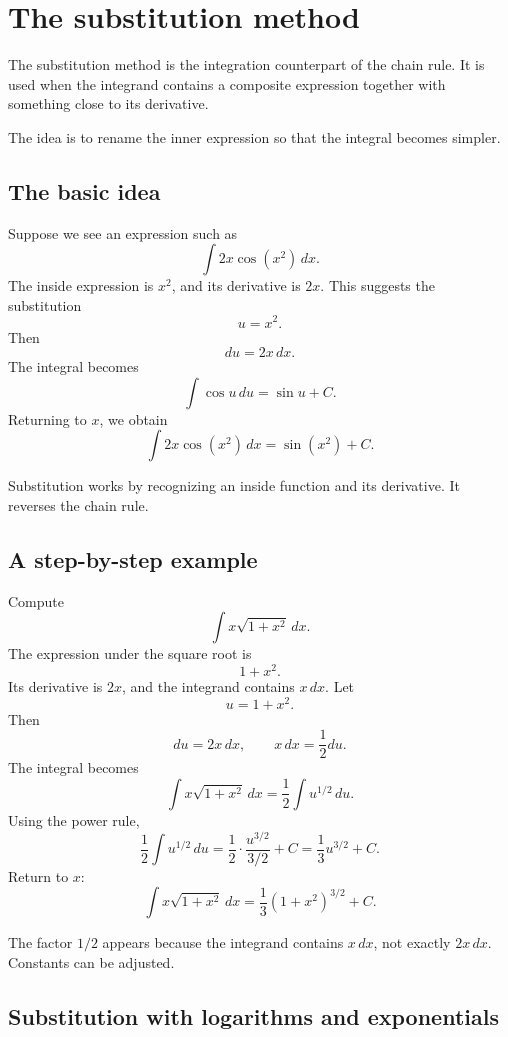 \section{The substitution method}

The substitution method is the integration counterpart of the chain rule. It is used when the integrand contains a composite expression together with something close to its derivative.

The idea is to rename the inner expression so that the integral becomes simpler.

\subsection*{The basic idea}

Suppose we see an expression such as
\[
\int 2x\cos(x^2)\,dx.
\]
The inside expression is \(x^2\), and its derivative is \(2x\). This suggests the substitution
\[
u=x^2.
\]
Then
\[
du=2x\,dx.
\]
The integral becomes
\[
\int \cos u\,du=\sin u+C.
\]
Returning to \(x\), we obtain
\[
\int 2x\cos(x^2)\,dx=\sin(x^2)+C.
\]

\begin{remarkbox}
Substitution works by recognizing an inside function and its derivative. It reverses the chain rule.
\end{remarkbox}

\subsection*{A step-by-step example}

\begin{examplebox}
Compute
\[
\int x\sqrt{1+x^2}\,dx.
\]
The expression under the square root is
\[
1+x^2.
\]
Its derivative is \(2x\), and the integrand contains \(x\,dx\). Let
\[
u=1+x^2.
\]
Then
\[
du=2x\,dx,
\qquad
x\,dx=\frac12du.
\]
The integral becomes
\[
\int x\sqrt{1+x^2}\,dx
=\frac12\int u^{1/2}\,du.
\]
Using the power rule,
\[
\frac12\int u^{1/2}\,du
=\frac12\cdot\frac{u^{3/2}}{3/2}+C
=\frac13u^{3/2}+C.
\]
Return to \(x\):
\[
\int x\sqrt{1+x^2}\,dx=\frac13(1+x^2)^{3/2}+C.
\]
\end{examplebox}

The factor \(1/2\) appears because the integrand contains \(x\,dx\), not exactly \(2x\,dx\). Constants can be adjusted.

\subsection*{Substitution with logarithms and exponentials}

